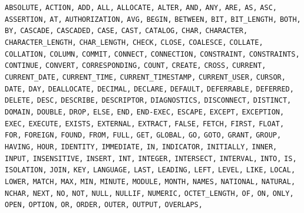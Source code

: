 \documentclass[11pt,a4paper]{ivoa}
\begin{document}
\noindent
\texttt{ABSOLUTE,} \texttt{ACTION,} \texttt{ADD,} \texttt{ALL,} 
\texttt{ALLOCATE,} \texttt{ALTER,} \texttt{AND,} \texttt{ANY,} 
\texttt{ARE,} \texttt{AS,} \texttt{ASC,} \texttt{ASSERTION,} 
\texttt{AT,} \texttt{AUTHORIZATION,} \texttt{AVG,} \texttt{BEGIN,} 
\texttt{BETWEEN,} \texttt{BIT,} \texttt{BIT\_LENGTH,} \texttt{BOTH,} 
\texttt{BY,} \texttt{CASCADE,} \texttt{CASCADED,} \texttt{CASE,} 
\texttt{CAST,} \texttt{CATALOG,} \texttt{CHAR,} \texttt{CHARACTER,} 
\texttt{CHARACTER\_LENGTH,} \texttt{CHAR\_LENGTH,} \texttt{CHECK,} 
\texttt{CLOSE,} \texttt{COALESCE,} \texttt{COLLATE,} 
\texttt{COLLATION,} \texttt{COLUMN,} \texttt{COMMIT,} 
\texttt{CONNECT,} \texttt{CONNECTION,} \texttt{CONSTRAINT,} 
\texttt{CONSTRAINTS,} \texttt{CONTINUE,} \texttt{CONVERT,} 
\texttt{CORRESPONDING,} \texttt{COUNT,} \texttt{CREATE,} 
\texttt{CROSS,} \texttt{CURRENT,} \texttt{CURRENT\_DATE,} 
\texttt{CURRENT\_TIME,} \texttt{CURRENT\_TIMESTAMP,} 
\texttt{CURRENT\_USER,} \texttt{CURSOR,} \texttt{DATE,} \texttt{DAY,} 
\texttt{DEALLOCATE,} \texttt{DECIMAL,} \texttt{DECLARE,} 
\texttt{DEFAULT,} \texttt{DEFERRABLE,} \texttt{DEFERRED,} 
\texttt{DELETE,} \texttt{DESC,} \texttt{DESCRIBE,} 
\texttt{DESCRIPTOR,} \texttt{DIAGNOSTICS,} \texttt{DISCONNECT,} 
\texttt{DISTINCT,} \texttt{DOMAIN,} \texttt{DOUBLE,} \texttt{DROP,} 
\texttt{ELSE,} \texttt{END,} \texttt{END-EXEC,} \texttt{ESCAPE,} 
\texttt{EXCEPT,} \texttt{EXCEPTION,} \texttt{EXEC,} \texttt{EXECUTE,} 
\texttt{EXISTS,} \texttt{EXTERNAL,} \texttt{EXTRACT,} \texttt{FALSE,} 
\texttt{FETCH,} \texttt{FIRST,} \texttt{FLOAT,} \texttt{FOR,} 
\texttt{FOREIGN,} \texttt{FOUND,} \texttt{FROM,} \texttt{FULL,} 
\texttt{GET,} \texttt{GLOBAL,} \texttt{GO,} \texttt{GOTO,} 
\texttt{GRANT,} \texttt{GROUP,} \texttt{HAVING,} \texttt{HOUR,} 
\texttt{IDENTITY,} \texttt{IMMEDIATE,} \texttt{IN,} 
\texttt{INDICATOR,} \texttt{INITIALLY,} \texttt{INNER,} 
\texttt{INPUT,} \texttt{INSENSITIVE,} \texttt{INSERT,} \texttt{INT,} 
\texttt{INTEGER,} \texttt{INTERSECT,} \texttt{INTERVAL,} 
\texttt{INTO,} \texttt{IS,} \texttt{ISOLATION,} \texttt{JOIN,} 
\texttt{KEY,} \texttt{LANGUAGE,} \texttt{LAST,} \texttt{LEADING,} 
\texttt{LEFT,} \texttt{LEVEL,} \texttt{LIKE,} \texttt{LOCAL,} 
\texttt{LOWER,} \texttt{MATCH,} \texttt{MAX,} \texttt{MIN,} 
\texttt{MINUTE,} \texttt{MODULE,} \texttt{MONTH,} \texttt{NAMES,} 
\texttt{NATIONAL,} \texttt{NATURAL,} \texttt{NCHAR,} \texttt{NEXT,} 
\texttt{NO,} \texttt{NOT,} \texttt{NULL,} \texttt{NULLIF,} 
\texttt{NUMERIC,} \texttt{OCTET\_LENGTH,} \texttt{OF,} \texttt{ON,} 
\texttt{ONLY,} \texttt{OPEN,} \texttt{OPTION,} \texttt{OR,} 
\texttt{ORDER,} \texttt{OUTER,} \texttt{OUTPUT,} \texttt{OVERLAPS,} 
\end{document}

